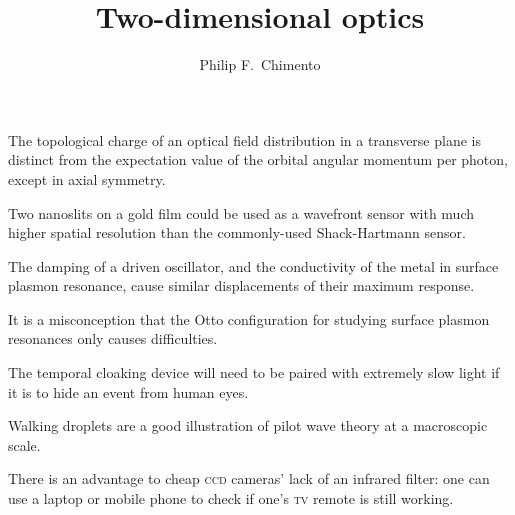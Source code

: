 \documentclass[10pt]{stellingen}
\newcommand\smallcaps[1]{{\scshape\MakeTextLowercase{#1}}}
\begin{document}
\title{Two-dimensional optics}
\author{Philip F.~Chimento}
\maketitle


\begin{stelling}
The topological charge of an optical field distribution in a transverse plane is distinct from the expectation value of the orbital angular momentum per photon, except in axial symmetry.
\end{stelling}

\begin{stelling}
Two nanoslits on a gold film could be used as a wavefront sensor with much higher spatial resolution than the commonly-used Shack-Hartmann sensor.
\end{stelling}

\begin{stelling}
The damping of a driven oscillator, and the conductivity of the metal in surface plasmon resonance, cause similar displacements of their maximum response.
\end{stelling}

\begin{stelling}
It is a misconception that the Otto configuration for studying surface plasmon resonances only causes difficulties.
\end{stelling}


\begin{stelling}
The temporal cloaking device will need to be paired with extremely slow light if it is to hide an event from human eyes.
\end{stelling}

\begin{stelling}
Walking droplets are a good illustration of pilot wave theory at a macroscopic scale.
\end{stelling}

\begin{stelling}
There is an advantage to cheap \smallcaps{CCD} cameras' lack of an infrared filter: one can use a laptop or mobile phone to check if one's \smallcaps{TV} remote is still working.
\end{stelling}
\end{document}

